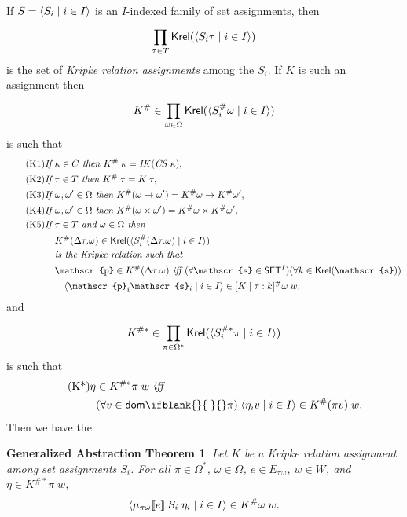 \documentclass[sigplan,screen,nonacm,balance=false]{acmart}
\theoremstyle{plain}
\DeclarePairedDelimiter{\pair}{\langle}{\rangle}
\DeclarePairedDelimiter{\interp}{\llbracket}{\rrbracket}
\newcommand{\dom}[1]{\mathsf{dom}\ifblank{#1}{\;}{#1}}
\newcommand{\SET}{\mathsf{SET}}
\newcommand{\Krel}{\mathsf{Krel}}
\newcommand{\CS}{\mathit{CS}}
\newcommand{\IK}{\mathit{IK}}
\newcommand{\scrs}{\mathscr{s}}
\newcommand{\scrp}{\mathscr{p}}
\begin{document}
If $S = \pair{S_i \mid i \in I}$ is an $I$-indexed family of set assignments, then
%
\begin{equation*}
  \prod_{\tau \in T}^{} \Krel(\pair{S_i \tau \mid i \in I})
\end{equation*}
%
is the set of \emph{Kripke relation assignments} among the $S_i$.
If $K$ is such an assignment then
%
\begin{equation*}
  K^\# \in \prod_{\omega \in \Omega}^{} \Krel(\pair{S_i^\# \omega \mid i \in I})
\end{equation*}
%
is such that
%
\begin{align*}
  \tag{K1}
  \textit{If } & \kappa \in C \textit{ then } K^\# \; \kappa = \IK(\CS \; \kappa), \\
  \tag{K2}
  \textit{If } & \tau \in T \textit{ then } K^\# \; \tau = K \; \tau, \\
  \tag{K3}
  \textit{If } & \omega, \omega' \in \Omega \textit{ then } K^\#(\omega \to \omega') = K^\# \omega \to K^\# \omega', \\
  \tag{K4}
  \textit{If } & \omega, \omega' \in \Omega \textit{ then } K^\#(\omega \times \omega') = K^\# \omega \times K^\# \omega', \\
  \tag{K5}
  \textit{If } & \tau \in T \textit{ and } \omega \in \Omega \textit{ then } \\
  & K^\#(\Delta \tau. \omega) \in \Krel(\pair{S_i^\#(\Delta \tau. \omega) \mid i \in I}) \\
  & \textit{is the Kripke relation such that} \\
  & \scrp \in K^\#(\Delta \tau. \omega) \textit{ iff } (\forall \scrs \in \SET^I) (\forall k \in \Krel(\scrs)) \\
  & \quad \pair{\scrp_i \scrs_i \mid i \in I} \in [K \mid \tau: k]^\# \omega \; w,
\end{align*}
%
and
%
\begin{equation*}
  K^{\#*} \in \prod_{\pi \in \Omega^*}^{} \Krel(\pair{S_i^{\#*} \pi \mid i \in I})
\end{equation*}
is such that
%
\begin{align*}\tag{K*}
  \eta & \in K^{\#*} \pi \; w \textit{ iff } \\
  & (\forall v \in \dom{} \pi) \; \pair{\eta_i v \mid i \in I} \in K^\#(\pi v) \; w.
\end{align*}
%
Then we have the

\newtheorem*{genabs}{Generalized Abstraction Theorem}
\begin{genabs}
  Let $K$ be a Kripke relation assignment among set assignments $S_i$.
  For all $\pi \in \Omega^*$, $\omega \in \Omega$, $e \in E_{\pi \omega}$, $w \in W$, and $\eta \in K^{\#*} \pi \; w$,
  \begin{equation*}
    \pair{\mu_{\pi \omega} \interp{e} \; S_i \; \eta_i \mid i \in I} \in K^\# \omega \; w.
  \end{equation*}
\end{genabs}
\end{document}
